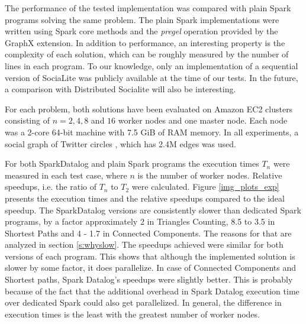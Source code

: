 The performance of the tested implementation was compared with plain Spark programs solving the same problem. The plain Spark implementations were written using Spark core methods and the \emph{pregel} operation provided by the GraphX extension. In addition to performance, an interesting property is the complexity of each solution, which can be roughly measured by the number of lines in each program. To our knowledge, only an implementation of a sequential version of SociaLite was publicly available at the time of our tests. In the future, a comparison with Distributed Socialite will also be interesting.

For each problem, both solutions have been evaluated on Amazon EC2 clusters consisting of $n = 2, 4, 8$ and $16$ worker nodes and one master node. Each node was a 2-core 64-bit machine with 7.5 GiB of RAM memory.  In all experiments, a social graph of Twitter circles \cite{twitterdata}, which has 2.4M edges was used.

For both SparkDatalog and plain Spark programs the execution times $T_n$ were measured in each test case, where $n$ is the number of worker nodes. Relative speedups, i.e. the ratio of $T_n$ to $T_2$ were calculated. Figure \ref{img_plots_exp} presents the execution times and the relative speedups compared to the ideal speedup. The SparkDatalog versions are consistently slower than dedicated Spark programs, by a factor approximately 2 in Triangles Counting, 8.5 to 3.5 in Shortest Paths and 4 - 1.7 in Connected Components. The reasons for that are analyzed in section \ref{s:whyslow}. The speedups achieved were similar for both versions of each program. This shows that although the implemented solution is slower by some factor, it does parallelize. In case of Connected Components and Shortest paths, Spark Datalog's speedups were slightly better. This is probably because of the fact that the additional overhead in Spark Datalog execution time over dedicated Spark could also get parallelized. In general, the difference in execution times is the least with the greatest number of worker nodes.

